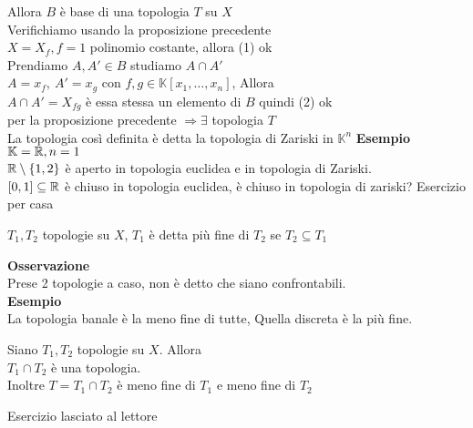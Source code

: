 \documentclass[12px]{article}
\begin{document}
Allora $B$ è base di una topologia $T$ su $X$\\
Verifichiamo usando la proposizione precedente\\
 $X = X_f, f = 1$ polinomio costante, allora (1) ok\\
 Prendiamo $A, A'\in B$ studiamo $A\cap A'$\\
 $A = x_f, \ A'=x_g$ con $f,g \in \mathbb K[x_1,\ldots,x_n]$, Allora\\
 $A\cap A' = X_{fg}$ è essa stessa un elemento di $B$ quindi (2) ok \\
 per la proposizione precedente $ \Rightarrow \exists$ topologia $T$\\
 La topologia così definita è detta la topologia di Zariski in  $\mathbb K^n$
	\textbf{Esempio}\\
	$\mathbb{K} = \mathbb{R}, n = 1$\\
	$\mathbb{R}\setminus\{1,2\}$ è aperto in topologia euclidea e in topologia di Zariski.\\
	$[0,1]\subseteq\mathbb{R}$ è chiuso in topologia euclidea, è chiuso in topologia di zariski? Esercizio per casa\\

	\begin{defi}
		$T_1,T_2$ topologie su $X$, $T_1$ è detta più fine di $T_2$ se $T_2\subseteq T_1$
	\end{defi}
	\textbf{Osservazione}\\
	Prese 2 topologie a caso, non è detto che siano confrontabili.\\
	\textbf{Esempio}\\
	La topologia banale è la meno fine di tutte, Quella discreta è la più fine.\\
	\begin{propo}
		Siano $ T_1,T_2$ topologie su $X$. Allora\\
		$T_1\cap T_2$ è una topologia.\\
		Inoltre $T = T_1\cap T_2$ è meno fine di $T_1$ e meno fine di $T_2$
	\end{propo}
	\begin{dimo}
		Esercizio lasciato al lettore
	\end{dimo}
\end{document}
